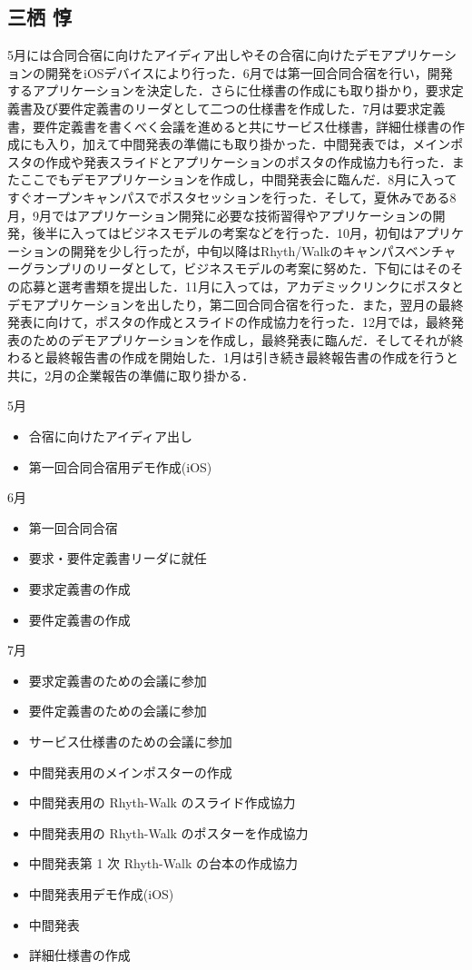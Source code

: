 \subsection{三栖 惇}
\par
5月には合同合宿に向けたアイディア出しやその合宿に向けたデモアプリケーションの開発をiOSデバイスにより行った．6月では第一回合同合宿を行い，開発するアプリケーションを決定した．さらに仕様書の作成にも取り掛かり，要求定義書及び要件定義書のリーダとして二つの仕様書を作成した．7月は要求定義書，要件定義書を書くべく会議を進めると共にサービス仕様書，詳細仕様書の作成にも入り，加えて中間発表の準備にも取り掛かった．中間発表では，メインポスタの作成や発表スライドとアプリケーションのポスタの作成協力も行った．またここでもデモアプリケーションを作成し，中間発表会に臨んだ．8月に入ってすぐオープンキャンパスでポスタセッションを行った．そして，夏休みである8月，9月ではアプリケーション開発に必要な技術習得やアプリケーションの開発，後半に入ってはビジネスモデルの考案などを行った．10月，初旬はアプリケーションの開発を少し行ったが，中旬以降はRhyth/Walkのキャンパスベンチャーグランプリのリーダとして，ビジネスモデルの考案に努めた．下旬にはそのその応募と選考書類を提出した．11月に入っては，アカデミックリンクにポスタとデモアプリケーションを出したり，第二回合同合宿を行った．また，翌月の最終発表に向けて，ポスタの作成とスライドの作成協力を行った．12月では，最終発表のためのデモアプリケーションを作成し，最終発表に臨んだ．そしてそれが終わると最終報告書の作成を開始した．1月は引き続き最終報告書の作成を行うと共に，2月の企業報告の準備に取り掛かる．
\par
5月
\begin{itemize}
\item 合宿に向けたアイディア出し
\item 第一回合同合宿用デモ作成(iOS)
\end{itemize}
6月
\begin{itemize}
\item 第一回合同合宿
\item 要求・要件定義書リーダに就任
\item 要求定義書の作成
\item 要件定義書の作成
\end{itemize}
7月
\begin{itemize}
\item 要求定義書のための会議に参加
\item 要件定義書のための会議に参加
\item サービス仕様書のための会議に参加
\item 中間発表用のメインポスターの作成
\item 中間発表用の Rhyth-Walk のスライド作成協力
\item 中間発表用の Rhyth-Walk のポスターを作成協力
\item 中間発表第 1 次 Rhyth-Walk の台本の作成協力
\item 中間発表用デモ作成(iOS)
\item 中間発表
\item 詳細仕様書の作成
\end{itemize}
